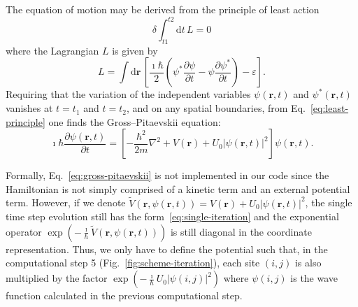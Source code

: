 The equation of motion may be derived from the principle of least action 
\begin{equation}
\delta \int_{t1}^{t2} \mathrm{d} t \, L = 0 \label{eq:least-principle}
\end{equation}
where the Lagrangian $L$ is given by
\begin{equation}
L = \int \mathrm{d} \textbf{r} \, \left[ \frac{\imath \hbar}{2} \left( \psi^\ast \frac{\partial \psi}{\partial t} - \psi \frac{\partial \psi^\ast}{\partial t} \right) - \varepsilon \right].
\end{equation}
Requiring that the variation of the independent variables $\psi(\textbf{r},t)$ and $\psi^\ast (\textbf{r},t)$ vanishes at $t=t_1$ and $t=t_2$, and on any spatial boundaries, from Eq.~\eqref{eq:least-principle} one finds the Gross--Pitaevskii equation:
\begin{equation} \label{eq:gross-pitaevskii}
\imath \hbar \frac{\partial \psi(\textbf{r}, t)}{\partial t} = \left[ - \frac{\hbar^2}{2m} \nabla^2 + V(\textbf{r}) + U_0 |\psi(\textbf{r}, t)|^2 \right] \psi(\textbf{r}, t).
\end{equation}

Formally, Eq.~\eqref{eq:gross-pitaevskii} is not implemented in our code since the Hamiltonian is not simply comprised of a kinetic term and an external potential term. However, if we denote $\tilde{V}(\textbf{r}, \psi(\textbf{r}, t)) = V(\textbf{r}) + U_0 |\psi(\textbf{r}, t)|^2$, the single time step evolution still has the form~\eqref{eq:single-iteration} and the exponential operator $\exp \left( - \frac{\imath}{\hbar} \tilde{V}(\textbf{r}, \psi(\textbf{r}, t)) \right)$ is still diagonal in the coordinate representation. Thus, we only have to define the potential such that, in the computational step 5 (Fig.~\ref{fig:scheme-iteration}), each site $(i,j)$ is also multiplied by the factor $\exp(-\frac{\imath}{\hbar} U_0 |\psi(i,j)|^2)$ where $\psi(i,j)$ is the wave function calculated in the previous computational step.

